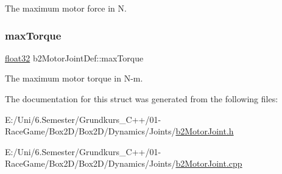 The maximum motor force in N. 

\mbox{\label{structb2_motor_joint_def_afcf5dd58166917a4574d1f28f6bb3660}} 
\subsubsection{\texorpdfstring{maxTorque}{maxTorque}}
{\footnotesize\ttfamily \mbox{\hyperlink{b2_settings_8h_aacdc525d6f7bddb3ae95d5c311bd06a1}{float32}} b2\+Motor\+Joint\+Def\+::max\+Torque}



The maximum motor torque in N-\/m. 



The documentation for this struct was generated from the following files\+:\begin{DoxyCompactItemize}
\item 
E\+:/\+Uni/6.\+Semester/\+Grundkurs\+\_\+\+C++/01-\/\+Race\+Game/\+Box2\+D/\+Box2\+D/\+Dynamics/\+Joints/\mbox{\hyperlink{b2_motor_joint_8h}{b2\+Motor\+Joint.\+h}}\item 
E\+:/\+Uni/6.\+Semester/\+Grundkurs\+\_\+\+C++/01-\/\+Race\+Game/\+Box2\+D/\+Box2\+D/\+Dynamics/\+Joints/\mbox{\hyperlink{b2_motor_joint_8cpp}{b2\+Motor\+Joint.\+cpp}}\end{DoxyCompactItemize}
